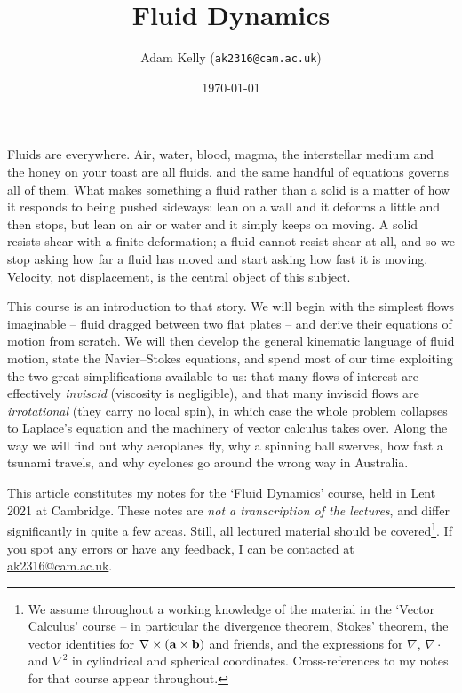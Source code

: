 \documentclass[a4paper]{scrartcl}
\title{Fluid Dynamics}
\author{Adam Kelly (\texttt{ak2316@cam.ac.uk})}
\date{\today}
\begin{document}
\maketitle

Fluids are everywhere. Air, water, blood, magma, the interstellar medium and the honey on your toast are all fluids, and the same handful of equations governs all of them. What makes something a fluid rather than a solid is a matter of how it responds to being pushed sideways: lean on a wall and it deforms a little and then stops, but lean on air or water and it simply keeps on moving. A solid resists shear with a finite deformation; a fluid cannot resist shear at all, and so we stop asking how far a fluid has moved and start asking how fast it is moving. Velocity, not displacement, is the central object of this subject.

This course is an introduction to that story. We will begin with the simplest flows imaginable -- fluid dragged between two flat plates -- and derive their equations of motion from scratch. We will then develop the general kinematic language of fluid motion, state the Navier--Stokes equations, and spend most of our time exploiting the two great simplifications available to us: that many flows of interest are effectively \emph{inviscid} (viscosity is negligible), and that many inviscid flows are \emph{irrotational} (they carry no local spin), in which case the whole problem collapses to Laplace's equation and the machinery of vector calculus takes over. Along the way we will find out why aeroplanes fly, why a spinning ball swerves, how fast a tsunami travels, and why cyclones go around the wrong way in Australia.

This article constitutes my notes for the `Fluid Dynamics' course, held in Lent 2021 at Cambridge. These notes are \emph{not a transcription of the lectures}, and differ significantly in quite a few areas. Still, all lectured material should be covered\footnote{We assume throughout a working knowledge of the material in the `Vector Calculus' course -- in particular the divergence theorem, Stokes' theorem, the vector identities for $\nabla \times (\mathbf{a} \times \mathbf{b})$ and friends, and the expressions for $\nabla$, $\nabla \cdot$ and $\nabla^2$ in cylindrical and spherical coordinates. Cross-references to my notes for that course appear throughout.}. If you spot any errors or have any feedback, I can be contacted at \href{mailto:ak2316@cam.ac.uk}{ak2316@cam.ac.uk}.

\tableofcontents
\end{document}

